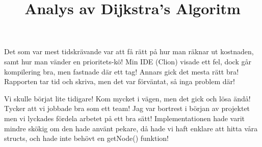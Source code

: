 \documentclass[fleqn,10pt]{article}
\begin{document}
\title{Analys av Dijkstra's Algoritm}

Det som var mest tidskrävande var att få rätt på hur man räknar ut kostnaden, samt hur man vänder en prioritets-kö! Min IDE (Clion) visade ett fel, dock går kompilering bra, men fastnade där ett tag! Annars gick det mesta rätt bra! Rapporten tar tid och skriva, men det var förväntat, så inga problem där!

Vi skulle börjat lite tidigare! Kom mycket i vägen, men det gick och lösa ändå! Tycker att vi jobbade bra som ett team! Jag var bortrest i början av projektet men vi lyckades fördela arbetet på ett bra sätt! Implementationen hade varit mindre skökig om den hade använt pekare, då hade vi haft enklare att hitta våra structs, och hade inte behövt en getNode() funktion! 
\end{document}
